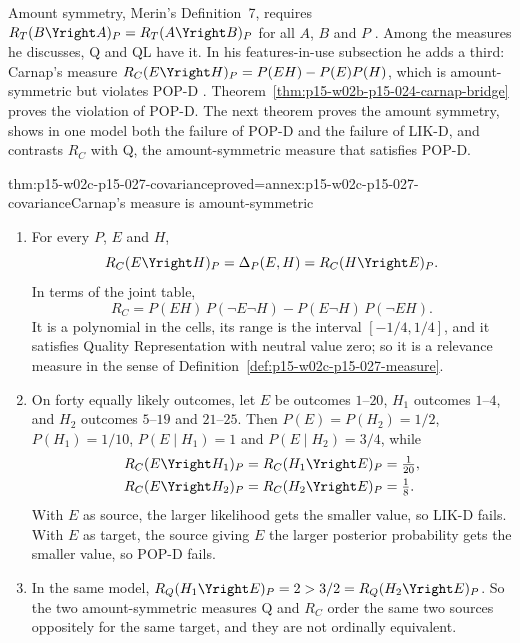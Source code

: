 Amount symmetry, Merin's Definition~7, requires
\(R_T(B\Yright A)_P=R_T(A\Yright B)_P\) for all \(A\), \(B\) and \(P\)
\cite[p.~269]{Merin2021Relevance}. Among the measures he discusses, Q and
QL have it. In his features-in-use subsection he adds a third:
Carnap's measure \(R_C(E\Yright H)_P=P(EH)-P(E)P(H)\), which is
amount-symmetric but violates POP-D \cite[p.~272]{Merin2021Relevance}.
Theorem~\ref{thm:p15-w02b-p15-024-carnap-bridge} proves the violation of
POP-D. The next theorem proves the amount symmetry, shows in one model
both the failure of POP-D and the failure of LIK-D, and contrasts \(R_C\)
with Q, the amount-symmetric measure that satisfies POP-D.

\begin{hbtheorem}{thm:p15-w02c-p15-027-covariance}{proved=annex:p15-w02c-p15-027-covariance}{Carnap's measure is amount-symmetric}
\begin{enumerate}
\item For every \(P\), \(E\) and \(H\),
  \[
   R_C(E\Yright H)_P=\Delta_P(E,H)=R_C(H\Yright E)_P .
  \]
  In terms of the joint table,
  \[
   R_C=P(EH)\,P(\neg E\neg H)-P(E\neg H)\,P(\neg EH).
  \]
  It is a polynomial in
  the cells, its range is the interval \([-1/4,1/4]\), and it satisfies
  Quality Representation with neutral value zero; so it is a relevance
  measure in the sense of Definition~\ref{def:p15-w02c-p15-027-measure}.
\item On forty equally likely outcomes, let \(E\) be outcomes
  \(1\)--\(20\), \(H_1\) outcomes \(1\)--\(4\), and \(H_2\) outcomes
  \(5\)--\(19\) and \(21\)--\(25\). Then \(P(E)=P(H_2)=1/2\),
  \(P(H_1)=1/10\), \(P(E\mid H_1)=1\) and \(P(E\mid H_2)=3/4\), while
  \[
  \begin{aligned}
   R_C(E\Yright H_1)_P&=R_C(H_1\Yright E)_P=\tfrac1{20},\\
   R_C(E\Yright H_2)_P&=R_C(H_2\Yright E)_P=\tfrac18 .
  \end{aligned}
  \]
  With \(E\) as source, the larger likelihood gets the smaller value, so
  LIK-D fails. With \(E\) as target, the source giving \(E\) the larger
  posterior probability gets the smaller value, so POP-D fails.
\item In the same model, \(R_Q(H_1\Yright E)_P=2>3/2=R_Q(H_2\Yright E)_P\).
  So the two amount-symmetric measures Q and \(R_C\) order the same two
  sources oppositely for the same target, and they are not ordinally
  equivalent.
\end{enumerate}
\end{hbtheorem}

